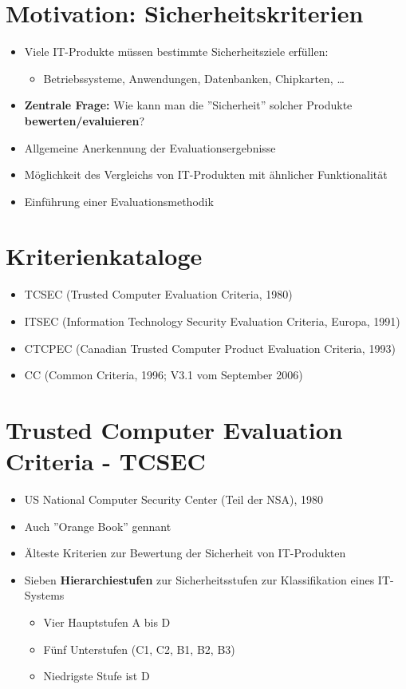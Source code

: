\documentclass[openany]{book}
\begin{document}
\section{Motivation: Sicherheitskriterien}

\begin{itemize}
    \item Viele IT-Produkte müssen bestimmte Sicherheitsziele erfüllen:
    \begin{itemize}
        \item Betriebssysteme, Anwendungen, Datenbanken, Chipkarten, \dots
    \end{itemize}
    \item \textbf{Zentrale Frage:} Wie kann man die ''Sicherheit'' solcher Produkte \textbf{bewerten/evaluieren}?
    \item Allgemeine Anerkennung der Evaluationsergebnisse
    \item Möglichkeit des Vergleichs von IT-Produkten mit ähnlicher Funktionalität
    \item Einführung einer Evaluationsmethodik
\end{itemize}

\section{Kriterienkataloge}

\begin{itemize}
    \item TCSEC (Trusted Computer Evaluation Criteria, 1980)
    \item ITSEC (Information Technology Security Evaluation Criteria, Europa, 1991)
    \item CTCPEC (Canadian Trusted Computer Product Evaluation Criteria, 1993)
    \item CC (Common Criteria, 1996; V3.1 vom September 2006)
\end{itemize}

\section{Trusted Computer Evaluation Criteria - TCSEC}

\begin{itemize}
    \item US National Computer Security Center (Teil der NSA), 1980
    \item Auch ''Orange Book'' gennant
    \item Älteste Kriterien zur Bewertung der Sicherheit von IT-Produkten
    \item Sieben \textbf{Hierarchiestufen} zur Sicherheitsstufen zur Klassifikation eines IT-Systems
    \begin{itemize}
        \item Vier Hauptstufen A bis D
        \item Fünf Unterstufen (C1, C2, B1, B2, B3)
        \item Niedrigste Stufe ist D
    \end{itemize}
\end{itemize}
\end{document}
